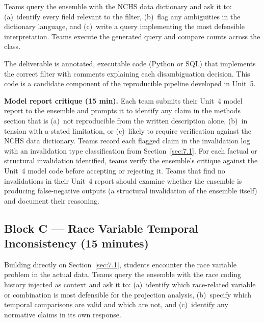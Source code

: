 Teams query the ensemble with the NCHS data dictionary and ask it
to: (a)~identify every field relevant to the filter, (b)~flag
any ambiguities in the dictionary language, and (c)~write a query
implementing the most defensible interpretation. Teams execute
the generated query and compare counts across the class.


The deliverable is annotated, executable code (Python or SQL) that
implements the correct filter with comments explaining each
disambiguation decision. This code is a candidate component of
the reproducible pipeline developed in Unit~5.

\textbf{Model report critique (15 min).} Each team submits
their Unit~4 model report to the ensemble and prompts it to
identify any claim in the methods section that is (a)~not
reproducible from the written description alone, (b)~in
tension with a stated limitation, or (c)~likely to require
verification against the NCHS data dictionary. Teams record
each flagged claim in the invalidation log with an invalidation
type classification from Section~\ref{sec:7.1}. For each
factual or structural invalidation identified, teams verify
the ensemble's critique against the Unit~4 model code before
accepting or rejecting it. Teams that find no invalidations
in their Unit~4 report should examine whether the ensemble
is producing false-negative outputs (a structural invalidation
of the ensemble itself) and document their reasoning.

\subsection*{Block C --- Race Variable Temporal Inconsistency
(15 minutes)}

Building directly on Section~\ref{sec:7.1}, students encounter
the race variable problem in the actual data. Teams query the
ensemble with the race coding history injected as context and ask
it to: (a)~identify which race-related variable or combination
is most defensible for the projection analysis, (b)~specify which
temporal comparisons are valid and which are not, and
(c)~identify any normative claims in its own response.

